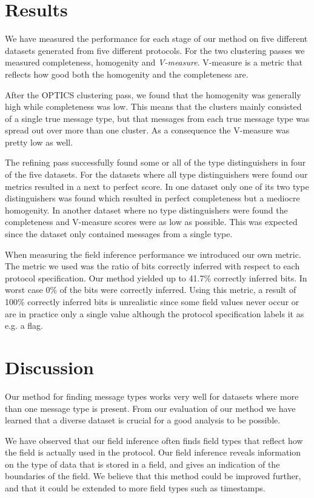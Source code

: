 \documentclass[a4paper,twocolumn]{article}
\begin{document}
\section{Results}
We have measured the performance for each stage of our method on five
different datasets generated from five different protocols. For the two
clustering passes we measured completeness, homogenity and \emph{V-measure}.
V-measure is a metric that reflects how good both the homogenity and the
completeness are. 

After the OPTICS clustering pass, we found that the homogenity was generally
high while completeness was low. This means that the clusters mainly
consisted of a single true message type, but that messages from each true
message type was spread out over more than one cluster. As a consequence the
V-measure was pretty low as well.

The refining pass successfully found some or all of the type distinguishers
in four of the five datasets. For the datasets where all type distinguishers
were found our metrics resulted in a next to perfect score. In one dataset
only one of its two type distinguishers was found which resulted in perfect
completeness but a mediocre homogenity. In another dataset where no
type distinguishers were found the completeness and V-measure scores were as
low as possible. This was expected since the dataset only contained messages
from a single type.

When measuring the field inference performance we introduced our own metric.
The metric we used was the ratio of bits correctly inferred with respect to
each protocol specification. Our method yielded up to 41.7\% correctly
inferred bits. In worst case 0\% of the bits were correctly inferred.
Using this metric, a result of 100\% correctly inferred bits is unrealistic
since some field values never occur or are in practice only a single value
although the protocol specification labels it as e.g. a flag.

\section{Discussion}
Our method for finding message types works very well for datasets where more
than one message type is present. From our evaluation of our method we have
learned that a diverse dataset is crucial for a good analysis to be possible.

We have observed that our field inference often finds field types that reflect
how the field is actually used in the protocol. Our field inference reveals
information on the type of data that is stored in a field, and gives an
indication of the boundaries of the field. We believe that this method could
be improved further, and that it could be extended to more field types such
as timestamps.
\end{document}
